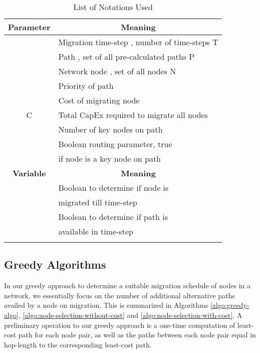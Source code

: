 \documentclass[conference]{IEEEtran}
\begin{document}
\begin{table}[tb]\begin{center}\caption{List of Notations Used}\label{table:symbols}
\begin{tabular}{ c l }
\toprule
\textbf{Parameter} & \multicolumn{1}{c}{\textbf{Meaning}} \\
\midrule
 & Migration time-step , number of time-steps T
\\\addlinespace[1.0mm]  & Path , set of all pre-calculated paths P \\\addlinespace[1.0mm]
 & Network node , set of all nodes N \\\addlinespace[1.0mm]
 & Priority of path  \\\addlinespace[1.0mm]
 & Cost of migrating node  \\\addlinespace[1.0mm]
C & Total CapEx required to migrate all nodes \\\addlinespace[1.0mm]
{} & Number of key nodes on path  \\\addlinespace[1.0mm]
\multirow{2}{*}{} & Boolean routing parameter, true \\
 &  if node  is a key node on path  \\\addlinespace[1.0mm]
\midrule
\textbf{Variable} & \multicolumn{1}{c}{\textbf{Meaning}} \\
\midrule
\multirow{2}{*}{} & Boolean to determine if node  is \\
 &  migrated till time-step  \\\addlinespace[1.0mm]
\multirow{2}{*}{} & Boolean to determine if path  is \\
 &  available in time-step  \\\addlinespace[1.0mm]
\bottomrule
\end{tabular}
\vspace{-5mm}
\end{center}\end{table}

\subsection{Greedy Algorithms} \label{sec:greedy-algo}
In our greedy approach to determine a suitable migration schedule of nodes in a
network, we essentially focus on the number of additional alternative paths
availed by a node on migration. This is summarized in Algorithms
\ref{algo:greedy-algo},
\ref{algo:node-selection-without-cost} and \ref{algo:node-selection-with-cost}.
A preliminary operation to our greedy approach is a one-time computation of 
least-cost path for each node pair, as well as the paths between each node
pair equal in hop-length to the corresponding least-cost path.
\end{document}
